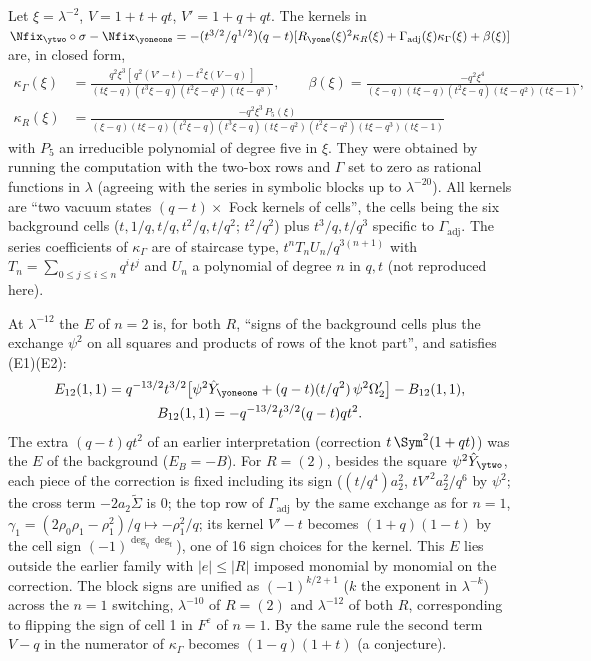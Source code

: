 \begin{result}\label{cr:tower}
Let $\xi = \lambda^{-2}$, $V = 1+t+qt$, $V' = 1+q+qt$. The kernels in $\Nfix_{\ytwo}\circ\sigma - \Nfix_{\yoneone} = -(t^{3/2}/q^{1/2})(q-t)[R_{\yone}(\xi)^2\kappa_R(\xi) + \Gamma_{\mathrm{adj}}(\xi)\kappa_\Gamma(\xi) + \beta(\xi)]$ are, in closed form,
\begingroup\small
\begin{align*}
\kappa_\Gamma(\xi) &= \frac{q^2\xi^3[\,q^2(V'-t) - t^2\xi(V-q)\,]}{(t\xi-q)(t^3\xi-q)(t^2\xi-q^2)(t\xi-q^3)},\qquad
\beta(\xi) = \frac{-q^2\xi^4}{(\xi-q)(t\xi-q)(t^2\xi-q)(t\xi-q^2)(t\xi-1)},\\
\kappa_R(\xi) &= \frac{-q^2\xi^3\,P_5(\xi)}{(\xi-q)(t\xi-q)(t^2\xi-q)(t^3\xi-q)(t\xi-q^2)(t^2\xi-q^2)(t\xi-q^3)(t\xi-1)}
\end{align*}
\endgroup
with $P_5$ an irreducible polynomial of degree five in $\xi$. They were obtained by running the computation with the two-box rows and $\Gamma$ set to zero as rational functions in $\lambda$ (agreeing with the series in symbolic blocks up to $\lambda^{-20}$). All kernels are ``two vacuum states $(q-t)\times$ Fock kernels of cells'', the cells being the six background cells ($t, 1/q, t/q, t^2/q, t/q^2$; $t^2/q^2$) plus $t^3/q, t/q^3$ specific to $\Gamma_{\mathrm{adj}}$. The series coefficients of $\kappa_\Gamma$ are of staircase type, $t^nT_nU_n/q^{3(n+1)}$ with $T_n = \sum_{0\le j\le i\le n}q^it^j$ and $U_n$ a polynomial of degree $n$ in $q, t$ (not reproduced here).
\end{result}
\begin{result}[$E$ at $\lambda^{-12}$ for $n = 2$: full exchange]\label{cr:n2E}
At $\lambda^{-12}$ the $E$ of $n = 2$ is, for both $R$, ``signs of the background cells plus the exchange $\psi^2$ on all squares and products of rows of the knot part'', and satisfies (E1)(E2):
\begin{gather*}
E_{12}(1,1) = q^{-13/2}t^{3/2}\bigl[\psi^2\hat Y_{\yoneone} + (q-t)(t/q^2)\,\psi^2\Omega'_2\bigr] - B_{12}(1,1),\\
B_{12}(1,1) = -q^{-13/2}t^{3/2}(q-t)qt^2 .
\end{gather*}
The extra $(q-t)qt^2$ of an earlier interpretation (correction $t\,\Sym^2(1+qt)$) was the $E$ of the background ($E_B = -B$). For $R = (2)$, besides the square $\psi^2\hat Y_{\ytwo}$, each piece of the correction is fixed including its sign ($(t/q^4)a_2^2$, $tV'^2a_2^2/q^6$ by $\psi^2$; the cross term $-2a_2\tilde\Sigma$ is $0$; the top row of $\Gamma_{\mathrm{adj}}$ by the same exchange as for $n = 1$, $\gamma_1 = (2\rho_0\rho_1 - \rho_1^2)/q \mapsto -\rho_1^2/q$; its kernel $V' - t$ becomes $(1+q)(1-t)$ by the cell sign $(-1)^{\deg_q\deg_t}$), one of 16 sign choices for the kernel. This $E$ lies outside the earlier family with $|e|\le|R|$ imposed monomial by monomial on the correction. The block signs are unified as $(-1)^{k/2+1}$ ($k$ the exponent in $\lambda^{-k}$) across the $n = 1$ switching, $\lambda^{-10}$ of $R = (2)$ and $\lambda^{-12}$ of both $R$, corresponding to flipping the sign of cell 1 in $F^\varepsilon$ of $n = 1$. By the same rule the second term $V - q$ in the numerator of $\kappa_\Gamma$ becomes $(1-q)(1+t)$ (a conjecture).
\end{result}

